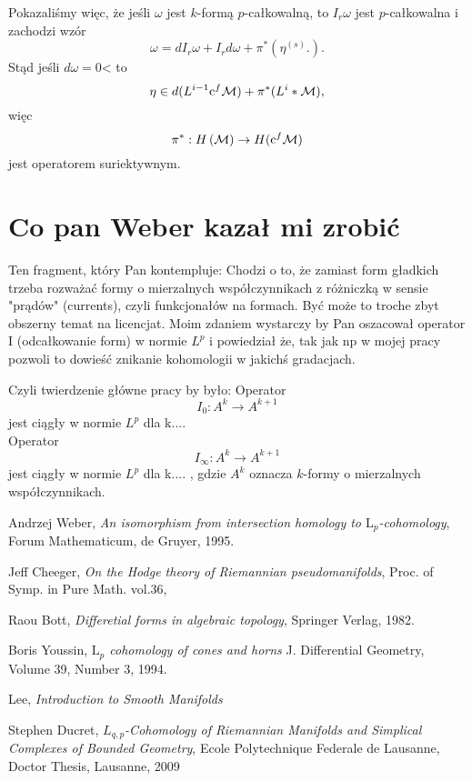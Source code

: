 \documentclass[licencjacka]{pracamgr}
\theoremstyle{definition}
\theoremstyle{definition}
\theoremstyle{plain}
\theoremstyle{plain}
\def\cfm{\ensuremath\mathrm{c}^f\mathcal{M}}
\def\M{\ensuremath\mathcal{M}}
\begin{document}
Pokazaliśmy więc, że jeśli $\omega$ jest $k$-formą $p$-całkowalną, to  $I_r \omega$ jest
$p$-całkowalna i zachodzi wzór
\[
    \omega = dI_r \omega + I_r d \omega + \pi^\ast 
    \left(
        \eta^{(s)}.
    \right).
\]
Stąd jeśli $d \omega = 0$< to 
\[
    \eta \in d(L^{i-1} \cfm) + \pi^\ast (L^i*\M),
\]
więc 
\[
    \pi^\ast: H \left( \M \right) \rightarrow H ( \cfm )
\]
jest operatorem suriektywnym. \\


\section{Co pan Weber kazał mi zrobić}
Ten fragment, który Pan kontempluje: Chodzi o to, że zamiast form gładkich
trzeba rozważać formy o mierzalnych współczynnikach z różniczką w sensie
"prądów" (currents), czyli funkcjonałów na formach. Być może to troche zbyt
obszerny temat na licencjat. Moim zdaniem wystarczy by Pan oszacował operator I
(odcałkowanie form) w normie $L^p$ i powiedział że, tak jak np w mojej pracy
pozwoli to dowieść znikanie kohomologii w jakichś gradacjach.

Czyli twierdzenie główne pracy by było: Operator
\[
 I_0:A^k \to A^{k+1}
\]
jest ciągły w normie $L^p$ dla k.... \\

Operator
\[
I_\infty:A^k \to A^{k+1}
\] jest ciągły w normie $L^p$ dla k.... ,
gdzie $A^k$ oznacza $k$-formy o mierzalnych współczynnikach. \\






\begin{thebibliography}{99}

 Andrzej Weber, \textit{An isomorphism from
  intersection homology to $\mathrm{L}_p$-cohomology}, Forum
  Mathematicum, de Gruyer, 1995.
  
 Jeff Cheeger, \textit{On the Hodge theory
  of Riemannian pseudomanifolds}, Proc. of Symp. in Pure Math. vol.36,


 Raou Bott, \textit{Differetial forms in algebraic
  topology}, Springer Verlag, 1982.

 Boris Youssin, \textit{$\mathrm{L}_p$
  cohomology of cones and horns } J. Differential Geometry, Volume 39,
  Number 3, 1994.
  
 Lee, \textit{Introduction to Smooth Manifolds}

 Stephen Ducret, \textit{$L_{q,p}$-Cohomology of Riemannian
    Manifolds and Simplical Complexes of Bounded Geometry}, Ecole Polytechnique Federale
    de Lausanne, Doctor Thesis, Lausanne, 2009

\end{thebibliography}
\end{document}
